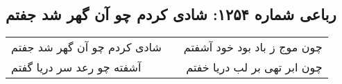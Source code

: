 \begin{center}
\section*{رباعی شماره ۱۲۵۴: شادی کردم چو آن گهر شد جفتم}
\label{sec:1254}
\begin{longtable}{l p{0.5cm} r}
شادی کردم چو آن گهر شد جفتم
&&
چون موج ز باد بود خود آشفتم
\\
آشفته چو رعد سر دریا گفتم
&&
چون ابر تهی بر لب دریا خفتم
\\
\end{longtable}
\end{center}
